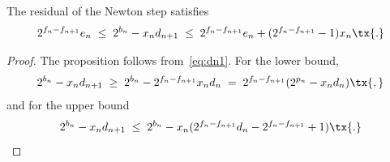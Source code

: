 \documentclass[12pt,oneside,draft]{scrartcl}
\begin{document}
\begin{proposition}
\label{prop:residual_bound}
The residual of the Newton step satisfies
\begin{gather}
  2^{f_{n} - f_{n + 1}} e_{n}
\;\le\;
  2^{b_{n}} - x_{n} d_{n + 1}
\;\le\;
  2^{f_{n} - f_{n + 1}} e_{n} + (2^{f_{n} - f_{n + 1}} - 1) x_{n}
\tx{.}
\end{gather}
\end{proposition}
\begin{proof}
The proposition follows from~\eqref{eq:dn1}.  For the lower bound,
\begin{gather*}
  2^{b_{n}} - x_{n} d_{n + 1}
\;\ge\;
  2^{b_{n}} - 2^{f_{n} - f_{n + 1}} x_{n} d_{n}
\;=\;
  2^{f_{n} - f_{n + 1}} (2^{p_{n}} - x_{n} d_{n})
\tx{,}
\end{gather*}
and for the upper bound
\begin{gather*}
  2^{b_{n}} - x_{n} d_{n + 1}
\;\le\;
  2^{b_{n}} - x_{n} (2^{f_{n} - f_{n + 1}} d_{n} - 2^{f_{n} - f_{n + 1}} + 1)
\tx{.}
\end{gather*}
\end{proof}
\end{document}
